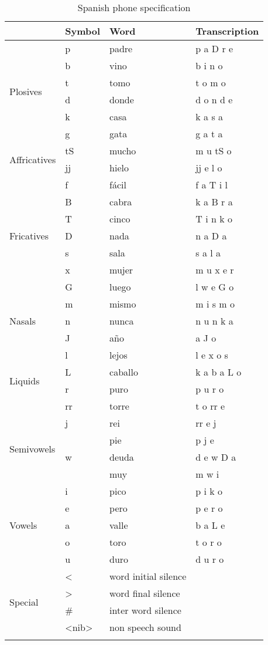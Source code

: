 {\small
\begin{longtable}{l|l|l|l}
	& Symbol & Word & Transcription\\
	\hline
	\multirow{6}{*}{Plosives} &
	p & padre & p a D r e\\
  & b & vino & b i n o\\
  & t & tomo & t o m o\\
  & d & donde & d o n d e\\
  & k & casa & k a s a\\
  & g & gata & g a t a\\
	\hline
	\multirow{2}{*}{Affricatives} &
	tS & mucho & m u tS o\\
	& jj & hielo & jj e l o\\
	\hline
	\multirow{7}{*}{Fricatives} &
	f & fácil & f a T i l\\
	& B & cabra & k a B r a\\
	& T & cinco & T i n k o\\
	& D & nada & n a D a\\
	& s & sala & s a l a \\
	& x & mujer & m u x e r\\
	& G & luego & l w e G o\\
	\hline
	\multirow{3}{*}{Nasals} &
	m & mismo & m i s m o\\
	& n & nunca & n u n k a\\
	& J & año & a J o\\
	\hline
	\multirow{4}{*}{Liquids} & 
	l & lejos & l e x o s\\
	& L & caballo & k a b a L o\\
	& r & puro & p u r o\\
	& rr & torre & t o rr e\\
	\hline
	\multirow{4}{*}{Semivowels} &
	j & rei & rr e j\\
	&  & pie & p j e\\
	& w & deuda & d e w D a\\
	&  & muy & m w i\\
	\hline
	\multirow{5}{*}{Vowels} &
	i & pico & p i k o\\
	& e & pero & p e r o\\
	& a & valle & b a L e\\
	& o & toro & t o r o\\
	& u & duro & d u r o\\
	\hline
	\multirow{4}{*}{Special} &
	\textless  & word initial silence & \\
	& \textgreater  & word final silence & \\
	& \# & inter word silence & \\
	& \textless nib\textgreater  & non speech sound & \\
	\hline
	\caption{Spanish phone specification}
\end{longtable}
}

